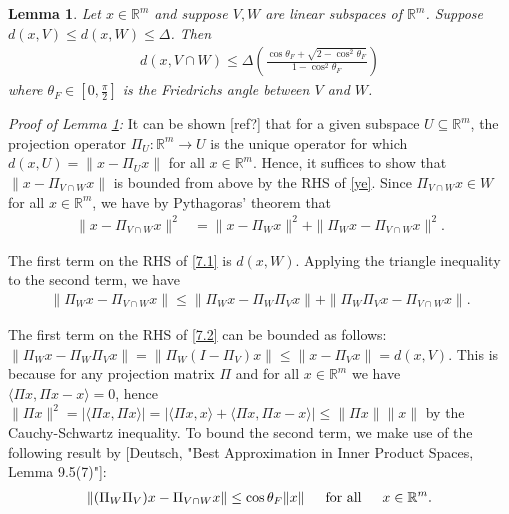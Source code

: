 \documentclass[journal,onecolumn]{IEEEtran}
\newtheorem{lemma}{Lemma}
\begin{document}
\begin{lemma}\label{DistanceToIntersectionLemma}
Let $x \in \mathbb{R}^m$ and suppose $V, W$ are linear subspaces of $\mathbb{R}^m$. Suppose $d(x,V) \leq d(x,W) \leq \Delta$. Then
\begin{align}\label{ye}
d(x, V \cap W) \leq \Delta \left( \frac{ \cos\theta_F + \sqrt{2 - \cos^2\theta_F} }{1 - \cos^2\theta_F} \right)
\end{align}
%
where $\theta_F \in [0, \frac{\pi}{2}]$ is the Friedrichs angle between $V$ and $W$. 
\end{lemma}

\emph{Proof of Lemma \ref{DistanceToIntersectionLemma}:} It can be shown [ref?] that for a given subspace $U \subseteq \mathbb{R}^m$, the projection operator $\Pi_U: \mathbb{R}^m \to U$ is the unique operator for which $d(x, U) = \|x - \Pi_U x\|$ for all $x \in \mathbb{R}^m$. Hence, it suffices to show that $\|x - \Pi_{V \cap W}x\|$ is bounded from above by the RHS of \eqref{ye}. Since $\Pi_{V \cap W}x \in W$ for all $x \in \mathbb{R}^m$, we have by Pythagoras' theorem that
\begin{align}\label{7.1}
\|x - \Pi_{V \cap W}x\|^2 &= \|x - \Pi_W x\|^2 + \|\Pi_Wx - \Pi_{V \cap W} x\|^2.
\end{align}

The first term on the RHS of \eqref{7.1} is $d(x,W)$. Applying the triangle inequality to the second term, we have
\begin{align}\label{7.2}
\|\Pi_Wx - \Pi_{V \cap W} x\| \leq \|\Pi_Wx - \Pi_W\Pi_V x\| + \|\Pi_W\Pi_Vx - \Pi_{V \cap W}x\|.
\end{align}

The first term on the RHS of \eqref{7.2}  can be bounded as follows: $\|\Pi_Wx - \Pi_W\Pi_V x\| = \|\Pi_W(I - \Pi_V)x\| \leq \|x - \Pi_Vx\| = d(x,V)$. This is because for any projection matrix $\Pi$ and for all $x \in \mathbb{R}^m$ we have $\langle \Pi x,\Pi x - x \rangle = 0$, hence $\|\Pi x\|^2 = | \langle \Pi x, \Pi x \rangle | = | \langle \Pi x, x \rangle + \langle \Pi x, \Pi x - x \rangle | \leq \|\Pi x\|\|x\|$ by the Cauchy-Schwartz inequality. To bound the second term, we make use of the following result by [Deutsch, "Best Approximation in Inner Product Spaces, Lemma 9.5(7)"]:
\begin{align}\label{dti2}
\|(\Pi_W\Pi_V)x - \Pi_{V \cap W}x\| \leq \cos\theta_F\|x\| \indent \text{for all} \indent x \in \mathbb{R}^m.
\end{align}
\end{document}
